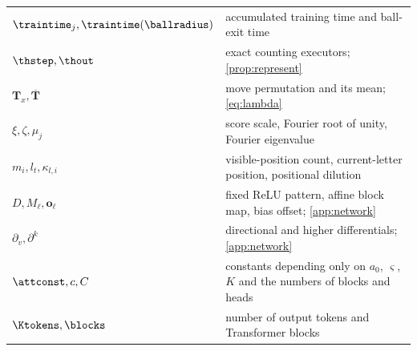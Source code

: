 \begin{center}
{\begin{tabular}{@{}ll@{}}
$\traintime_j,\traintime(\ballradius)$ & accumulated training time and ball-exit time\\
$\thstep,\thout$ & exact counting executors; \cref{prop:represent}\\
$\bm T_x,\overline{\bm T}$ & move permutation and its mean; \cref{eq:lambda}\\
$\xi,\zeta,\mu_j$ & score scale, Fourier root of unity, Fourier eigenvalue\\
$m_i,l_t,\kappa_{l,i}$ & visible-position count, current-letter position, positional dilution\\
$D,M_\ell,\bm o_\ell$ & fixed ReLU pattern, affine block map, bias offset; \cref{app:network}\\
$\partial_v,\partial^k$ & directional and higher differentials; \cref{app:network}\\
$\attconst,c,C$ & constants depending only on $a_0$, $\varsigma$, $K$ and the numbers of blocks and heads\\
$\Ktokens,\blocks$ & number of output tokens and Transformer blocks\\
\bottomrule
\end{tabular}}
\label{tab:notation}
\end{center}
